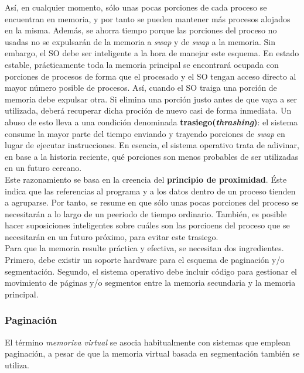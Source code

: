 \documentclass{article}
\begin{document}
		Así, en cualquier momento, sólo unas pocas porciones de cada proceso se encuentran en memoria, y por tanto se pueden mantener más procesos alojados en la misma. Además, se ahorra tiempo porque las porciones del proceso no usadas no se expulsarán de la memoria a \textit{swap} y de \textit{swap} a la memoria. Sin embargo, el SO debe ser inteligente a la hora de manejar este esquema. En estado estable, prácticamente toda la memoria principal se encontrará ocupada con porciones de procesos de forma que el procesado y el SO tengan acceso directo al mayor número posible de procesos. Así, cuando el SO traiga una porción de memoria debe expulsar otra. Si elimina una porción justo antes de que vaya a ser utilizada, deberá recuperar dicha proción de nuevo casi de forma inmediata. Un abuso de esto lleva a una condición denominada \textbf{trasiego(\textit{thrashing})}: el sistema consume la mayor parte del tiempo enviando y trayendo porciones de \textit{swap} en lugar de ejecutar instrucciones. En esencia, el sistema operativo trata de adivinar, en base a la historia reciente, qué porciones son menos probables de ser utilizadas en un futuro cercano. \\
		
		Este razonamiento se basa en la creencia del \textbf{principio de proximidad}. Éste indica que las referencias al programa y a los datos dentro de un proceso tienden a agruparse. Por tanto, se resume en que sólo unas pocas porciones del proceso se necesitarán a lo largo de un peeriodo de tiempo ordinario. También, es posible hacer suposiciones inteligentes sobre cuáles son las porcioens del proceso que se necesitarán en un futuro próximo, para evitar este trasiego. \\
		
		Para que la memoria resulte práctica y efectiva, se necesitan dos ingredientes. Primero, debe existir un soporte hardware para el esquema de paginación y/o segmentación. Segundo, el sistema operativo debe incluir código para gestionar el movimiento de páginas y/o segmentos entre la memoria secundaria y la memoria principal. \\
		
	\subsubsection{Paginación}
		El término \textit{memoriva virtual} se asocia habitualmente con sistemas que emplean paginación, a pesar de que la memoria virtual basada en segmentación también se utiliza. \\
		
\end{document}
